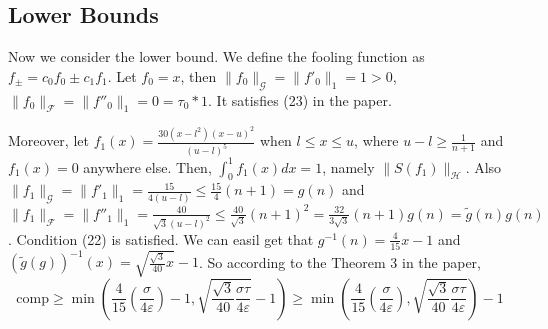 \documentclass[12pt]{article}
\begin{document}

\subsection{Lower Bounds}
Now we consider the lower bound. We define the fooling function as $f_{\pm}=c_0f_0\pm c_1f_1$. Let $f_0=x$, then $\|f_0\|_{\mathcal{G}}=\|f'_0\|_1=1>0$, $\|f_0\|_{\mathcal{F}}=\|f''_0\|_1=0=\tau_0*1$. It satisfies (23) in the paper.

Moreover, let $f_1(x)=\frac{30(x-l^2)(x-u)^2}{(u-l)^5}$ when $l \leq x \leq u$, where $u-l\geq\frac{1}{n+1}$ and $f_1(x)=0$ anywhere else. Then, $\int_{0}^{1}f_1(x)dx=1$, namely $\|S(f_1)\|_{\mathcal{H}}$. Also $\|f_1\|_{\mathcal{G}}=\|f'_{1}\|_1=\frac{15}{4(u-l)}\leq \frac{15}{4}(n+1)=g(n)$ and $\|f_1\|_{\mathcal{F}}=\|f''_{1}\|_1=\frac{40}{\sqrt{3}(u-l)^2}\leq \frac{40}{\sqrt{3}}(n+1)^2=\frac{32}{3\sqrt{3}}(n+1)g(n)=\tilde{g}(n)g(n)$. Condition (22) is satisfied. We can easil get that $g^{-1}(n)=\frac{4}{15}x-1$ and $(\tilde{g}(g))^{-1}(x)=\sqrt{\frac{\sqrt{3}}{40}x}-1$. So according to the Theorem 3 in the paper, $$\text{comp}\geq \min\left(\frac{4}{15}(\frac{\sigma}{4\varepsilon})-1,\sqrt{\frac{\sqrt{3}}{40}\frac{\sigma\tau}{4\varepsilon}}-1\right)\geq\min\left(\frac{4}{15}(\frac{\sigma}{4\varepsilon}),\sqrt{\frac{\sqrt{3}}{40}\frac{\sigma\tau}{4\varepsilon}}\right)-1$$
\end{document}

